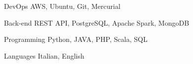 

\begin{cvskills}

  \cvskill
    {DevOps} %
    {AWS, Ubuntu, Git, Mercurial} %

  \cvskill
    {Back-end} %
    {REST API, PostgreSQL, Apache Spark, MongoDB} %


  \cvskill
    {Programming} %
    {Python, JAVA, PHP, Scala, SQL} %

  \cvskill
    {Languages} %
    {Italian, English} %

\end{cvskills}
